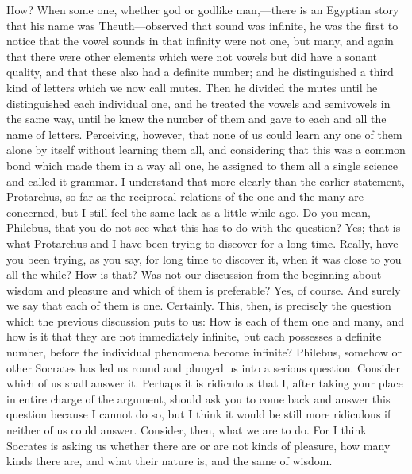 \documentclass[letterpaper,12pt]{article}
\newcommand{\stephpag}[1]{\marginnote{\small\itshape\fontfamily{ppl}\selectfont #1}}
\begin{document}
\begin{drama}
How?
\socratesspeaks
When some one, whether god or godlike man,---there is an Egyptian story that his name was Theuth---observed that sound was infinite, he was the first to notice that the vowel sounds in that infinity were not one, but many, and again that there were other elements which were not vowels but did have a sonant quality, \stephpag{c} and that these also had a definite number; and he distinguished a third kind of letters which we now call mutes. Then he divided the mutes until he distinguished each individual one, and he treated the vowels and semivowels in the same way, until he knew the number of them and gave to each and all the name of letters. Perceiving, however, that none of us could learn any one of them alone by itself without learning them all, and considering that this was a common bond which made them in a way all one, \stephpag{d} he assigned to them all a single science and called it grammar.
\philebusspeaks
I understand that more clearly than the earlier statement, Protarchus, so far as the reciprocal relations of the one and the many are concerned, but I still feel the same lack as a little while ago.
\socratesspeaks
Do you mean, Philebus, that you do not see what this has to do with the question?
\philebusspeaks
Yes; that is what Protarchus and I have been trying to discover for a long time.
\socratesspeaks
Really, have you been trying, as you say, \stephpag{e} for long time to discover it, when it was close to you all the while?
\philebusspeaks
How is that?
\socratesspeaks
Was not our discussion from the beginning about wisdom and pleasure and which of them is preferable?
\philebusspeaks
Yes, of course.
\socratesspeaks
And surely we say that each of them is one.
\philebusspeaks
Certainly.
\socratesspeaks
This, then, is precisely the question which the previous discussion puts to us: How is each of them one and many, and how is it that they are not immediately infinite, but each possesses a definite number, before the individual phenomena become infinite? \stephpag{19 a}
\protarchusspeaks
Philebus, somehow or other Socrates has led us round and plunged us into a serious question. Consider which of us shall answer it. Perhaps it is ridiculous that I, after taking your place in entire charge of the argument, should ask you to come back and answer this question because I cannot do so, but I think it would be still more ridiculous if neither of us could answer. \stephpag{b} Consider, then, what we are to do. For I think Socrates is asking us whether there are or are not kinds of pleasure, how many kinds there are, and what their nature is, and the same of wisdom.

\end{drama}
\end{document}
